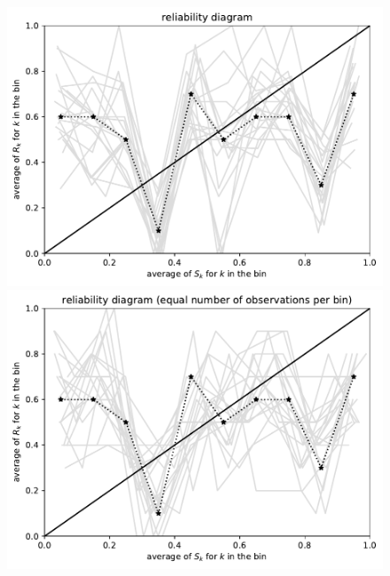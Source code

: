 \documentclass{article}
\begin{document}
\begin{figure}
\begin{centering}
\vspace{\vertsep}

\parbox{\imsize}{\includegraphics[width=\imsize]
                {./codes/unweighted/100_10_0_0/equiprob.pdf}}
\quad\quad
\parbox{\imsize}{\includegraphics[width=\imsize]
                {./codes/unweighted/100_10_0_0/equisamp.pdf}}

\vspace{\vertsep}


\end{centering}
\end{figure}
\end{document}
